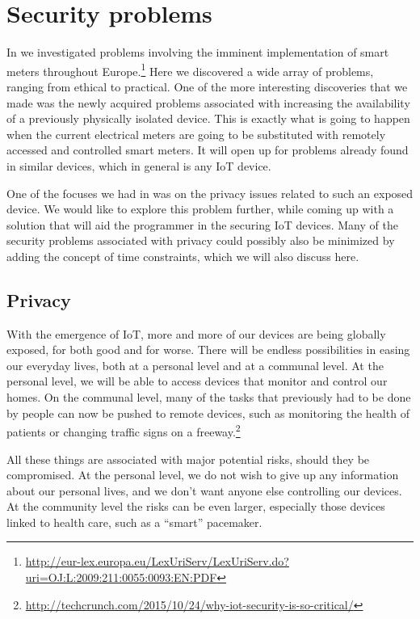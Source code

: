 
\section{Security problems}
In \cite{prespecialization} we investigated problems involving the imminent implementation of smart meters throughout Europe.\footnote{\url{http://eur-lex.europa.eu/LexUriServ/LexUriServ.do?uri=OJ:L:2009:211:0055:0093:EN:PDF}}
Here we discovered a wide array of problems, ranging from ethical to practical.
One of the more interesting discoveries that we made was the newly acquired problems associated with increasing the availability of a previously physically isolated device.
This is exactly what is going to happen when the current electrical meters are going to be substituted with remotely accessed and controlled smart meters.
It will open up for problems already found in similar devices, which in general is any IoT device.

One of the focuses we had in \cite{prespecialization} was on the privacy issues related to such an exposed device.
We would like to explore this problem further, while coming up with a solution that will aid the programmer in the securing IoT devices.
Many of the security problems associated with privacy could possibly also be minimized by adding the concept of time constraints, which we will also discuss here.

\subsection{Privacy}
With the emergence of IoT, more and more of our devices are being globally exposed, for both good and for worse.
There will be endless possibilities in easing our everyday lives, both at a personal level and at a communal level.
At the personal level, we will be able to access devices that monitor and control our homes.
On the communal level, many of the tasks that previously had to be done by people can now be pushed to remote devices, such as monitoring the health of patients or changing traffic signs on a freeway.\footnote{\url{http://techcrunch.com/2015/10/24/why-iot-security-is-so-critical/}}

All these things are associated with major potential risks, should they be compromised.
At the personal level, we do not wish to give up any information about our personal lives, and we don't want anyone else controlling our devices.
At the community level the risks can be even larger, especially those devices linked to health care, such as a ``smart'' pacemaker.

